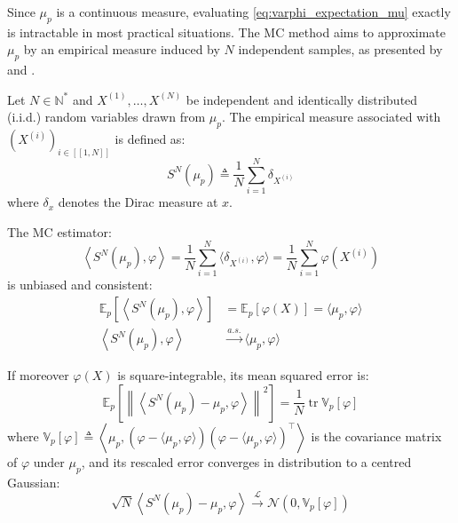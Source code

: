 Since $\mu_p$ is a continuous measure, evaluating \eqref{eq:varphi_expectation_mu} exactly is intractable in most practical situations. The MC method aims to approximate $\mu_p$ by an empirical measure induced by $N$ independent samples, as presented by  and .

\begin{definition}\label{th:empirical_measure}
	Let $N\in\mathbb{N}^*$ and $X^{(1)},\dots,X^{(N)}$ be independent and identically distributed (i.i.d.) random variables drawn from $\mu_p$. The empirical measure associated with $\left(X^{(i)}\right)_{i\in[\![1,N]\!]}$ is defined as:
	\begin{equation}
		S^N(\mu_p)\triangleq\frac{1}{N}\sum_{i=1}^N\delta_{X^{(i)}}
	\end{equation}
	where $\delta_x$ denotes the Dirac measure at $x$.
\end{definition}

\begin{proposition}\label{th:MC_estimator}
	The MC estimator:
	\begin{equation}
		\left\langle S^N(\mu_p),\varphi\right\rangle=\frac{1}{N}\sum_{i=1}^N\langle\delta_{X^{(i)}},\varphi\rangle=\frac{1}{N}\sum_{i=1}^N\varphi\left(X^{(i)}\right)
	\end{equation}
	is unbiased and consistent:
	\begin{align}
		\mathbb{E}_p\left[\left\langle S^N(\mu_p),\varphi\right\rangle\right]&=\mathbb{E}_p[\varphi(X)]=\langle\mu_p,\varphi\rangle\\
		\left\langle S^N(\mu_p),\varphi\right\rangle&\overset{a.s.}{\longrightarrow}\langle\mu_p,\varphi\rangle
	\end{align}

	If moreover $\varphi(X)$ is square-integrable, its mean squared error is:
	\begin{equation}
		\mathbb{E}_p\left[\left\|\left\langle S^N(\mu_p)-\mu_p,\varphi\right\rangle\right\|^2\right]=\frac{1}{N}\operatorname{tr}\mathbb{V}_p[\varphi]
	\end{equation}
	where $\mathbb{V}_p[\varphi]\triangleq\left\langle\mu_p,(\varphi-\langle\mu_p,\varphi\rangle)(\varphi-\langle\mu_p,\varphi\rangle)^\top\right\rangle$ is the covariance matrix of $\varphi$ under $\mu_p$, and its rescaled error converges in distribution to a centred Gaussian:
	\begin{equation}
		\sqrt{N}\left\langle S^N(\mu_p)-\mu_p,\varphi\right\rangle\overset{\mathcal{L}}{\longrightarrow}\mathcal{N}(0,\mathbb{V}_p[\varphi])
	\end{equation}
\end{proposition}

